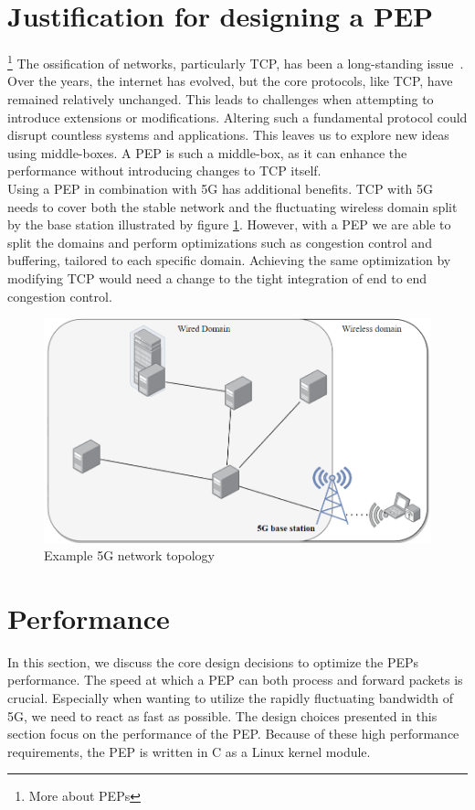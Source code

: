 \documentclass[a4paper,english, 11pt]{report}
\begin{document}
\section{Justification for designing a PEP}\footnote{More about PEPs}
The ossification of networks, particularly TCP, has been a long-standing issue~\cite{tcp_extendable}. Over the years, the internet has evolved, but the core protocols, like TCP, have remained relatively unchanged. This leads to challenges when attempting to introduce extensions or modifications. Altering such a fundamental protocol could disrupt countless systems and applications. This leaves us to explore new ideas using middle-boxes. A PEP is such a middle-box, as it can enhance the performance without introducing changes to TCP itself.\\

Using a PEP in combination with 5G has additional benefits. TCP with 5G needs to cover both the stable network and the fluctuating wireless domain split by the base station illustrated by figure \ref{fig:5g_topology}. However, with a PEP we are able to split the domains and perform optimizations such as congestion control and buffering, tailored to each specific domain. Achieving the same optimization by modifying TCP would need a change to the tight integration of end to end congestion control.\\

\begin{figure}[h!] %
	\centering
	\includegraphics[scale=0.6]{../diagrams/drawio/deployment_without_pep.png}
  	\caption{Example 5G network topology}
  	\label{fig:5g_topology}
\end{figure}


\section{Performance}
In this section, we discuss the core design decisions to optimize the PEPs performance.
The speed at which a PEP can both process and forward packets is crucial. Especially when wanting to utilize the rapidly fluctuating bandwidth of 5G, we need to react as fast as possible. The design choices presented in this section focus on the performance of the PEP. Because of these high performance requirements, the PEP is written in C as a Linux kernel module. 
\end{document}
